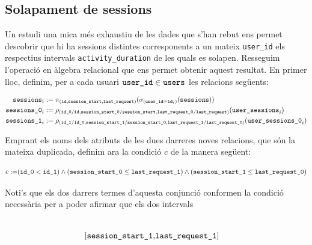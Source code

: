 \documentclass[
	a4paper,
	twoside,
	justified
]{tufte-book}
\begin{document}
\subsection{Solapament de sessions}

Un estudi una mica més exhaustiu de les dades que s'han rebut ens permet descobrir que hi ha sessions distintes corresponents a un mateix \texttt{user\_id} els respectius intervals \texttt{activity\_duration} de les quals es solapen. Resseguim l'operació en àlgebra relacional \citep{codd70} que ens permet obtenir aquest resultat. En primer lloc, definim, per a cada usuari $\texttt{user\_id} \in \texttt{users}$ les relacions següents:

\begin{fullwidth}
  \begin{align*}
  \texttt{sessions}_i & := \pi_{(\texttt{id},
                                    \texttt{session\_start},
                                    \texttt{last\_request})}( 
                \sigma_{(\texttt{user\_id}=\texttt{id}_i)}(
                    \texttt{sessions})) \\
  \texttt{sessions\_0}_i & 
      := \rho_{(\texttt{id\_0} / \texttt{id}, 
                \texttt{session\_start\_0}/\texttt{session\_start},
                \texttt{last\_request\_0}/\texttt{last\_request})}(
            \texttt{user\_sessions}_i) \\
  \texttt{sessions\_1}_i & 
      := \rho_{(\texttt{id\_1} / \texttt{id\_0}, 
                \texttt{session\_start\_1}/\texttt{session\_start\_0},
                \texttt{last\_request\_1}/\texttt{last\_request\_0})}(
              \texttt{user\_sessions\_0}_i) \\
  \end{align*}
\end{fullwidth}

Emprant els noms dels atributs de les dues darreres noves relacions, que són la mateixa duplicada, definim ara la condició $c$ de la manera següent: 

\begin{align*}
c := & (\texttt{id\_0} < \texttt{id\_1}) \wedge (\texttt{session\_start\_0} \leq \texttt{last\_request\_1}) \wedge  (\texttt{session\_start\_1} \leq \texttt{last\_request\_0}) \\
\end{align*}

Noti's que els dos darrers termes d'aquesta conjunció conformen la condició necessària per a poder afirmar que els dos intervals 

\begin{align*}
	[\mt{session\_start\_0}, & \mt{last\_request\_0}] \\
	[\mt{session\_start\_1}, & \mt{last\_request\_1}]
\end{align*} 
\end{document}
